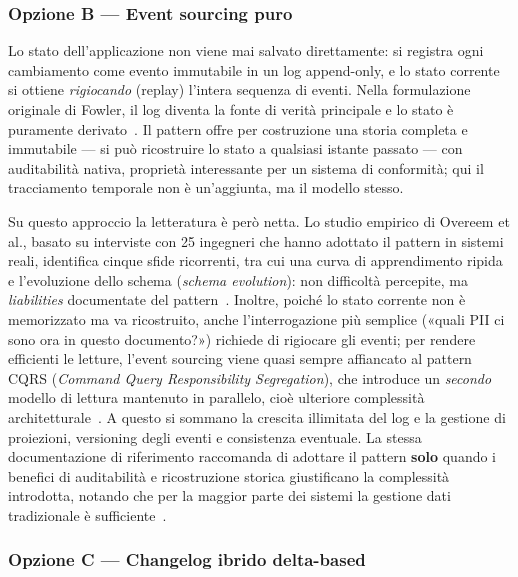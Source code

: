 \subsubsection{Opzione B --- Event sourcing puro}

Lo stato dell'applicazione non viene mai salvato direttamente: si registra ogni cambiamento come evento immutabile in un log append-only, e lo stato corrente si ottiene \textit{rigiocando} (replay) l'intera sequenza di eventi. Nella formulazione originale di Fowler, il log diventa la fonte di verità principale e lo stato è puramente derivato~\cite{fowlerEventSourcing2005}. Il pattern offre per costruzione una storia completa e immutabile --- si può ricostruire lo stato a qualsiasi istante passato --- con auditabilità nativa, proprietà interessante per un sistema di conformità; qui il tracciamento temporale non è un'aggiunta, ma il modello stesso.

Su questo approccio la letteratura è però netta. Lo studio empirico di Overeem et al., basato su interviste con 25 ingegneri che hanno adottato il pattern in sistemi reali, identifica cinque sfide ricorrenti, tra cui una curva di apprendimento ripida e l'evoluzione dello schema (\textit{schema evolution}): non difficoltà percepite, ma \textit{liabilities} documentate del pattern~\cite{overeemEmpiricalCharacterizationEvent2021}. Inoltre, poiché lo stato corrente non è memorizzato ma va ricostruito, anche l'interrogazione più semplice («quali PII ci sono ora in questo documento?») richiede di rigiocare gli eventi; per rendere efficienti le letture, l'event sourcing viene quasi sempre affiancato al pattern CQRS (\textit{Command Query Responsibility Segregation}), che introduce un \textit{secondo} modello di lettura mantenuto in parallelo, cioè ulteriore complessità architetturale~\cite{youngCQRSDocuments, microsoftAzureEventSourcing, awsEventSourcingPattern}. A questo si sommano la crescita illimitata del log e la gestione di proiezioni, versioning degli eventi e consistenza eventuale. La stessa documentazione di riferimento raccomanda di adottare il pattern \textbf{solo} quando i benefici di auditabilità e ricostruzione storica giustificano la complessità introdotta, notando che per la maggior parte dei sistemi la gestione dati tradizionale è sufficiente~\cite{microsoftAzureEventSourcing}.

\subsubsection{Opzione C --- Changelog ibrido delta-based}

